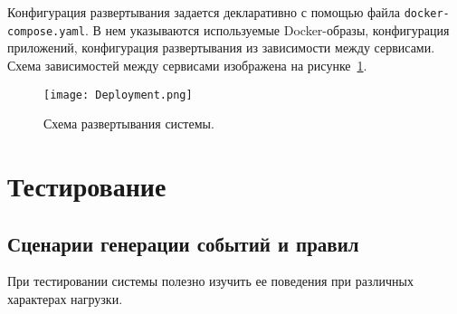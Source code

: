 \documentclass[14pt]{article}
\begin{document}
Конфигурация развертывания задается декларативно с помощью файла  \verb|docker-compose.yaml|. В нем указываются используемые Docker-образы, конфигурация приложений, конфигурация развертывания из зависимости между сервисами. Схема зависимостей между сервисами изображена на рисунке~\ref{fig:deployment}.

\begin{figure}[h]
    \centering
    \texttt{[image: Deployment.png]}
    \caption{Схема развертывания системы.}
    \label{fig:deployment}
\end{figure}

\section{Тестирование}
\label{section:testing}

\subsection{Сценарии генерации событий и правил}
\label{section:generationScenarios}
При тестировании системы полезно изучить ее поведения при различных характерах нагрузки.
\end{document}
